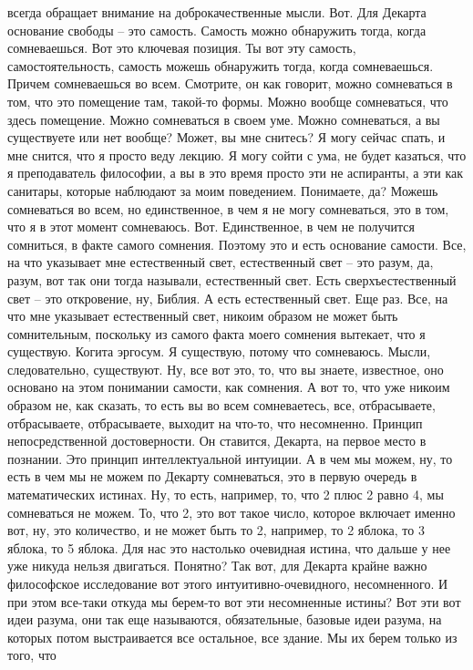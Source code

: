 всегда обращает внимание на доброкачественные мысли. Вот. Для Декарта основание
свободы – это самость. Самость можно обнаружить тогда, когда сомневаешься. Вот
это ключевая позиция. Ты вот эту самость, самостоятельность, самость можешь
обнаружить тогда, когда сомневаешься. Причем сомневаешься во всем. Смотрите, он
как говорит, можно сомневаться в том, что это помещение там, такой-то формы.
Можно вообще сомневаться, что здесь помещение. Можно сомневаться в своем уме.
Можно сомневаться, а вы существуете или нет вообще? Может, вы мне снитесь? Я
могу сейчас спать, и мне снится, что я просто веду лекцию. Я могу сойти с ума,
не будет казаться, что я преподаватель философии, а вы в это время просто эти не
аспиранты, а эти как санитары, которые наблюдают за моим поведением. Понимаете,
да? Можешь сомневаться во всем, но единственное, в чем я не могу сомневаться,
это в том, что я в этот момент сомневаюсь. Вот. Единственное, в чем не получится
сомниться, в факте самого сомнения. Поэтому это и есть основание самости. Все,
на что указывает мне естественный свет, естественный свет – это разум, да,
разум, вот так они тогда называли, естественный свет. Есть сверхъестественный
свет – это откровение, ну, Библия. А есть естественный свет. Еще раз. Все, на
что мне указывает естественный свет, никоим образом не может быть сомнительным,
поскольку из самого факта моего сомнения вытекает, что я существую. Когита
эргосум. Я существую, потому что сомневаюсь. Мысли, следовательно, существуют.
Ну, все вот это, то, что вы знаете, известное, оно основано на этом понимании
самости, как сомнения. А вот то, что уже никоим образом не, как сказать, то есть
вы во всем сомневаетесь, все, отбрасываете, отбрасываете, отбрасываете, выходит
на что-то, что несомненно. Принцип непосредственной достоверности. Он ставится,
Декарта, на первое место в познании. Это принцип интеллектуальной интуиции. А в
чем мы можем, ну, то есть в чем мы не можем по Декарту сомневаться, это в первую
очередь в математических истинах. Ну, то есть, например, то, что 2 плюс 2 равно
4, мы сомневаться не можем. То, что 2, это вот такое число, которое включает
именно вот, ну, это количество, и не может быть то 2, например, то 2 яблока, то
3 яблока, то 5 яблока. Для нас это настолько очевидная истина, что дальше у нее
уже никуда нельзя двигаться. Понятно? Так вот, для Декарта крайне важно
философское исследование вот этого интуитивно-очевидного, несомненного. И при
этом все-таки откуда мы берем-то вот эти несомненные истины? Вот эти вот идеи
разума, они так еще называются, обязательные, базовые идеи разума, на которых
потом выстраивается все остальное, все здание. Мы их берем только из того, что
